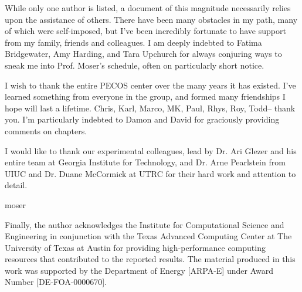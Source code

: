 %

While only one author is listed, a document of this magnitude
necessarily relies upon the assistance of others. There have
been many obstacles in my path, many of which were self-imposed, but
I've been incredibly fortunate to have support from my family, friends
and colleagues. 
%
%
I am deeply indebted to Fatima Bridgewater, Amy Harding, and Tara
Upchurch for always conjuring ways to sneak me into Prof. Moser's
schedule, often on particularly short notice. 

%
%
I wish to thank the entire PECOS center over the many years it has
existed. I've learned something from everyone in the group, and formed
many friendships I hope will last a lifetime. Chris, Karl, Marco, MK,
Paul, Rhys, Roy, Todd-- thank you. I'm particularly indebted to Damon and
David for graciously providing comments on chapters.   

%
%
I would like to thank our experimental colleagues, lead by Dr\@. Ari Glezer and his 
entire team at Georgia Institute for Technology, and Dr\@. Arne
Pearlstein from UIUC and Dr\@. Duane McCormick at UTRC for their hard
work and attention to detail. 

%
%
moser


%
%
%


Finally, the author acknowledges the Institute for Computational Science
and Engineering in conjunction with the Texas Advanced Computing Center
at The University of Texas at Austin for providing high-performance
computing resources that contributed to the reported results.
The material produced in this work was supported by the Department of
Energy [ARPA-E] under Award Number [DE-FOA-0000670].


